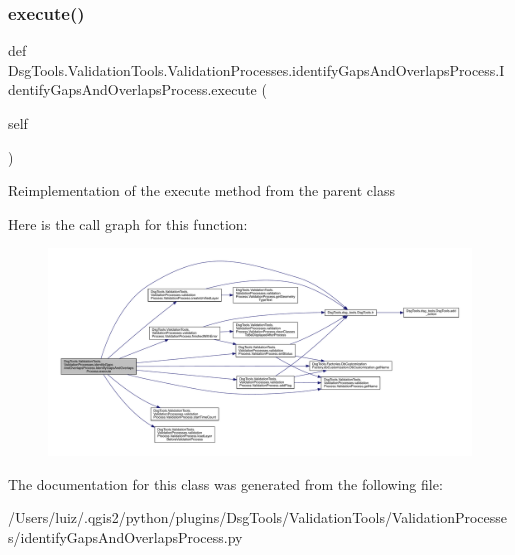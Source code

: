 \subsubsection{\texorpdfstring{execute()}{execute()}}
{\footnotesize\ttfamily def Dsg\+Tools.\+Validation\+Tools.\+Validation\+Processes.\+identify\+Gaps\+And\+Overlaps\+Process.\+Identify\+Gaps\+And\+Overlaps\+Process.\+execute (\begin{DoxyParamCaption}\item[{}]{self }\end{DoxyParamCaption})}

\begin{DoxyVerb}Reimplementation of the execute method from the parent class
\end{DoxyVerb}
 Here is the call graph for this function\+:
\nopagebreak
\begin{figure}[H]
\begin{center}
\leavevmode
\includegraphics[width=350pt]{class_dsg_tools_1_1_validation_tools_1_1_validation_processes_1_1identify_gaps_and_overlaps_proc6c71562b24620a794ca7de9d16d249e2_ad297412d0a73949f14440cb3a156e946_cgraph}
\end{center}
\end{figure}


The documentation for this class was generated from the following file\+:\begin{DoxyCompactItemize}
\item 
/\+Users/luiz/.\+qgis2/python/plugins/\+Dsg\+Tools/\+Validation\+Tools/\+Validation\+Processes/identify\+Gaps\+And\+Overlaps\+Process.\+py\end{DoxyCompactItemize}

